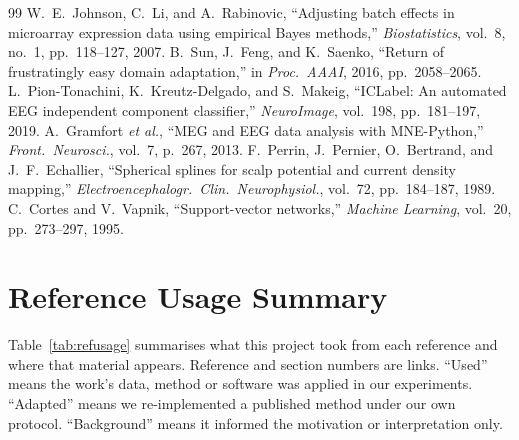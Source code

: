 \documentclass[10pt,twocolumn,a4paper]{article}
\begin{document}
\begin{thebibliography}{99}
 W.~E.~Johnson, C.~Li, and A.~Rabinovic, ``Adjusting batch effects in microarray expression data using empirical Bayes methods,'' \emph{Biostatistics}, vol.~8, no.~1, pp.~118--127, 2007.
 B.~Sun, J.~Feng, and K.~Saenko, ``Return of frustratingly easy domain adaptation,'' in \emph{Proc.\ AAAI}, 2016, pp.~2058--2065.
 L.~Pion-Tonachini, K.~Kreutz-Delgado, and S.~Makeig, ``ICLabel: An automated EEG independent component classifier,'' \emph{NeuroImage}, vol.~198, pp.~181--197, 2019.
 A.~Gramfort \emph{et al.}, ``MEG and EEG data analysis with MNE-Python,'' \emph{Front.\ Neurosci.}, vol.~7, p.~267, 2013.
 F.~Perrin, J.~Pernier, O.~Bertrand, and J.~F.~Echallier, ``Spherical splines for scalp potential and current density mapping,'' \emph{Electroencephalogr.\ Clin.\ Neurophysiol.}, vol.~72, pp.~184--187, 1989.
 C.~Cortes and V.~Vapnik, ``Support-vector networks,'' \emph{Machine Learning}, vol.~20, pp.~273--297, 1995.
\end{thebibliography}

\section*{Reference Usage Summary}
\label{sec:refusage}
Table~\ref{tab:refusage} summarises what this project took from each reference and where that material appears. Reference and section numbers are links. ``Used'' means the work's data, method or software was applied in our experiments. ``Adapted'' means we re-implemented a published method under our own protocol. ``Background'' means it informed the motivation or interpretation only.
\end{document}
